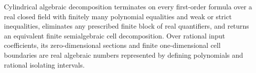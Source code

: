 Cylindrical algebraic decomposition terminates on every first-order formula over a real closed field with finitely many polynomial equalities and weak or strict inequalities, eliminates any prescribed finite block of real quantifiers, and returns an equivalent finite semialgebraic cell decomposition.  Over rational input coefficients, its zero-dimensional sections and finite one-dimensional cell boundaries are real algebraic numbers represented by defining polynomials and rational isolating intervals.